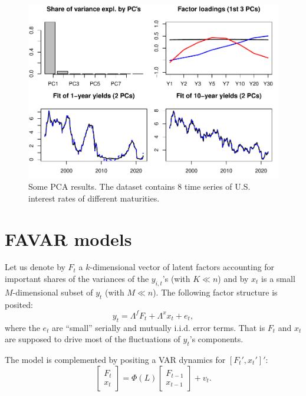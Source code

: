 \documentclass[
  12pt,
]{book}
\theoremstyle{definition}
\theoremstyle{definition}
\theoremstyle{definition}
\theoremstyle{definition}
\theoremstyle{remark}
\begin{document}
\begin{figure}
\includegraphics{IdentifStructShocks_files/figure-latex/USydsPCA1-1} \caption{Some PCA results. The dataset contains 8 time series of U.S. interest rates of different maturities.}\label{fig:USydsPCA1}
\end{figure}

\section{FAVAR models}\label{favar-models}

Let us denote by \(F_t\) a \(k\)-dimensional vector of latent factors accounting for important shares of the variances of the \(y_{i,t}\)'s (with \(K \ll n\)) and by \(x_t\) is a small \(M\)-dimensional subset of \(y_t\) (with \(M \ll n\)). The following factor structure is posited:
\[
y_t = \Lambda^f F_t + \Lambda^x x_t + e_t,
\]
where the \(e_t\) are ``small'' serially and mutually i.i.d. error terms. That is \(F_t\) and \(x_t\) are supposed to drive most of the fluctuations of \(y_t\)'s components.

The model is complemented by positing a VAR dynamics for \([F_t',x_t']'\):
\begin{equation}
\left[\begin{array}{c}F_t\\x_t\end{array}\right] = \Phi(L)\left[\begin{array}{c}F_{t-1}\\ x_{t-1}\end{array}\right] + v_t.\label{eq:FAVAR}
\end{equation}
\end{document}
